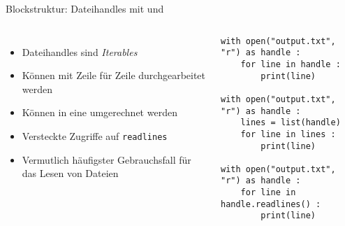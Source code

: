 \begin{frame}[fragile]{Blockstruktur: Dateihandles mit  und }
%
\begin{columns}[T]
\begin{itemize}
\item Dateihandles sind \emph{Iterables}
\item Können mit  Zeile für Zeile durchgearbeitet werden
\item Können in eine  umgerechnet werden
\item Versteckte Zugriffe auf \texttt{readlines}
\item Vermutlich häufigster Gebrauchsfall für das Lesen von Dateien
\end{itemize}
%
\begin{codebox}
\begin{verbatim}
with open("output.txt", "r") as handle :
    for line in handle :
        print(line)

with open("output.txt", "r") as handle :
    lines = list(handle)
    for line in lines :
        print(line)

with open("output.txt", "r") as handle :
    for line in handle.readlines() :
        print(line)
\end{verbatim}
\end{codebox}
%
\end{columns}
%
\end{frame}


